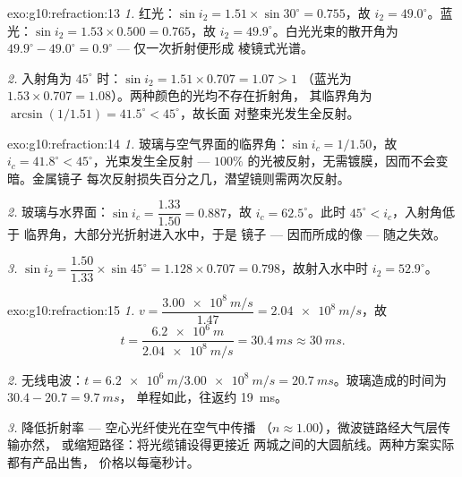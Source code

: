 \begin{solution}{exo:g10:refraction:13}
\emph{1.} 红光：$\sin i_2 = 1.51 \times \sin 30^\circ = 0.755$，故
$i_2 = 49.0^\circ$。蓝光：$\sin i_2 = 1.53 \times 0.500 = 0.765$，故
$i_2 = 49.9^\circ$。白光光束的散开角为
$49.9^\circ - 49.0^\circ = 0.9^\circ$ --- 仅一次折射便形成
棱镜式光谱。

\emph{2.} 入射角为 $45^\circ$ 时：$\sin i_2 = 1.51 \times 0.707 = 1.07 > 1$
（蓝光为 $1.53 \times 0.707 = 1.08$）。两种颜色的光均不存在折射角，
其临界角为
$\arcsin(1/1.51) = 41.5^\circ < 45^\circ$，故长面
对整束光发生全反射。
\end{solution}

\begin{solution}{exo:g10:refraction:14}
\emph{1.} 玻璃与空气界面的临界角：$\sin i_c = 1/1.50$，故
$i_c = 41.8^\circ < 45^\circ$，光束发生全反射 --- $100\%$
的光被反射，无需镀膜，因而不会变暗。金属镜子
每次反射损失百分之几，潜望镜则需两次反射。

\emph{2.} 玻璃与水界面：$\sin i_c = \dfrac{1.33}{1.50} = 0.887$，故
$i_c = 62.5^\circ$。此时 $45^\circ < i_c$，入射角低于
临界角，大部分光折射进入水中，于是
镜子 --- 因而所成的像 --- 随之失效。

\emph{3.} $\sin i_2 = \dfrac{1.50}{1.33} \times \sin 45^\circ
= 1.128 \times 0.707 = 0.798$，故射入水中时 $i_2 = 52.9^\circ$。
\end{solution}

\begin{solution}{exo:g10:refraction:15}
\emph{1.} $v = \dfrac{\qty{3.00e8}{m/s}}{1.47} = \qty{2.04e8}{m/s}$，故
\[
t = \frac{\qty{6.2e6}{m}}{\qty{2.04e8}{m/s}} = \qty{30.4}{ms} \approx
\qty{30}{ms}.
\]

\emph{2.} 无线电波：$t = \qty{6.2e6}{m}/\qty{3.00e8}{m/s} =
\qty{20.7}{ms}$。玻璃造成的时间为 $30.4 - 20.7 = \qty{9.7}{ms}$，
单程如此，往返约 \qty{19}{ms}。

\emph{3.} 降低折射率 --- 空心光纤使光在空气中传播
（$n \approx 1.00$），微波链路经大气层传输亦然，
或缩短路径：将光缆铺设得更接近
两城之间的大圆航线。两种方案实际都有产品出售，
价格以每毫秒计。
\end{solution}

